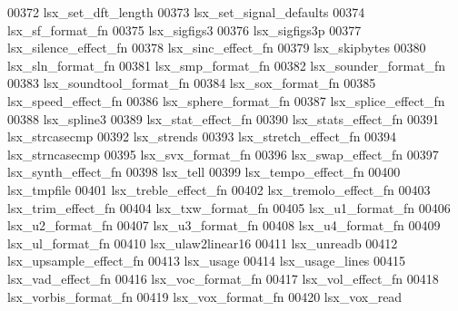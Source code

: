 \begin{DoxyCode}
00372 \textcolor{stringliteral}{lsx\_set\_dft\_length}
00373 \textcolor{stringliteral}{lsx\_set\_signal\_defaults}
00374 \textcolor{stringliteral}{lsx\_sf\_format\_fn}
00375 \textcolor{stringliteral}{lsx\_sigfigs3}
00376 \textcolor{stringliteral}{lsx\_sigfigs3p}
00377 \textcolor{stringliteral}{lsx\_silence\_effect\_fn}
00378 \textcolor{stringliteral}{lsx\_sinc\_effect\_fn}
00379 \textcolor{stringliteral}{lsx\_skipbytes}
00380 \textcolor{stringliteral}{lsx\_sln\_format\_fn}
00381 \textcolor{stringliteral}{lsx\_smp\_format\_fn}
00382 \textcolor{stringliteral}{lsx\_sounder\_format\_fn}
00383 \textcolor{stringliteral}{lsx\_soundtool\_format\_fn}
00384 \textcolor{stringliteral}{lsx\_sox\_format\_fn}
00385 \textcolor{stringliteral}{lsx\_speed\_effect\_fn}
00386 \textcolor{stringliteral}{lsx\_sphere\_format\_fn}
00387 \textcolor{stringliteral}{lsx\_splice\_effect\_fn}
00388 \textcolor{stringliteral}{lsx\_spline3}
00389 \textcolor{stringliteral}{lsx\_stat\_effect\_fn}
00390 \textcolor{stringliteral}{lsx\_stats\_effect\_fn}
00391 \textcolor{stringliteral}{lsx\_strcasecmp}
00392 \textcolor{stringliteral}{lsx\_strends}
00393 \textcolor{stringliteral}{lsx\_stretch\_effect\_fn}
00394 \textcolor{stringliteral}{lsx\_strncasecmp}
00395 \textcolor{stringliteral}{lsx\_svx\_format\_fn}
00396 \textcolor{stringliteral}{lsx\_swap\_effect\_fn}
00397 \textcolor{stringliteral}{lsx\_synth\_effect\_fn}
00398 \textcolor{stringliteral}{lsx\_tell}
00399 \textcolor{stringliteral}{lsx\_tempo\_effect\_fn}
00400 \textcolor{stringliteral}{lsx\_tmpfile}
00401 \textcolor{stringliteral}{lsx\_treble\_effect\_fn}
00402 \textcolor{stringliteral}{lsx\_tremolo\_effect\_fn}
00403 \textcolor{stringliteral}{lsx\_trim\_effect\_fn}
00404 \textcolor{stringliteral}{lsx\_txw\_format\_fn}
00405 \textcolor{stringliteral}{lsx\_u1\_format\_fn}
00406 \textcolor{stringliteral}{lsx\_u2\_format\_fn}
00407 \textcolor{stringliteral}{lsx\_u3\_format\_fn}
00408 \textcolor{stringliteral}{lsx\_u4\_format\_fn}
00409 \textcolor{stringliteral}{lsx\_ul\_format\_fn}
00410 \textcolor{stringliteral}{lsx\_ulaw2linear16}
00411 \textcolor{stringliteral}{lsx\_unreadb}
00412 \textcolor{stringliteral}{lsx\_upsample\_effect\_fn}
00413 \textcolor{stringliteral}{lsx\_usage}
00414 \textcolor{stringliteral}{lsx\_usage\_lines}
00415 \textcolor{stringliteral}{lsx\_vad\_effect\_fn}
00416 \textcolor{stringliteral}{lsx\_voc\_format\_fn}
00417 \textcolor{stringliteral}{lsx\_vol\_effect\_fn}
00418 \textcolor{stringliteral}{lsx\_vorbis\_format\_fn}
00419 \textcolor{stringliteral}{lsx\_vox\_format\_fn}
00420 \textcolor{stringliteral}{lsx\_vox\_read}

\end{DoxyCode}
